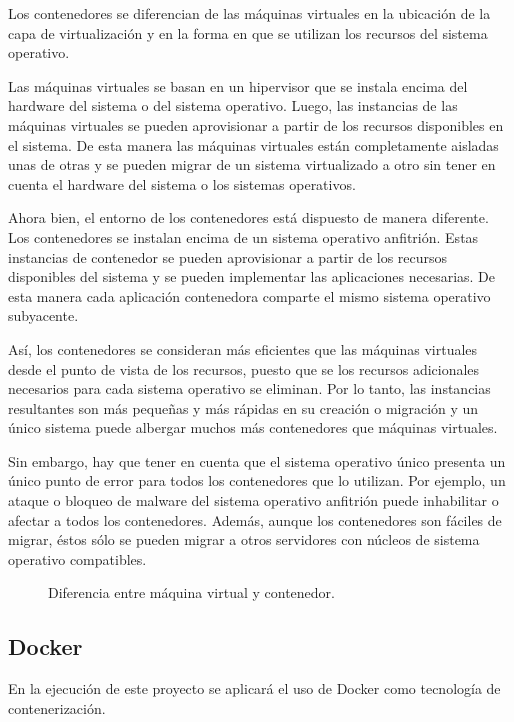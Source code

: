 Los contenedores se diferencian de las máquinas virtuales en la ubicación de la capa de virtualización y en la forma en que se utilizan los recursos del sistema operativo.

Las máquinas virtuales se basan en un hipervisor que se instala encima del hardware del sistema o del sistema operativo. Luego, las instancias de las máquinas virtuales se pueden aprovisionar a partir de los recursos disponibles en el sistema. De esta manera las máquinas virtuales están completamente aisladas unas de otras y se pueden migrar de un sistema virtualizado a otro sin tener en cuenta el hardware del sistema o los sistemas operativos.

Ahora bien, el entorno de los contenedores está dispuesto de manera diferente. Los contenedores se instalan encima de un sistema operativo anfitrión. Estas instancias de contenedor se pueden aprovisionar a partir de los recursos disponibles del sistema y se pueden implementar las aplicaciones necesarias. De esta manera cada aplicación contenedora comparte el mismo sistema operativo subyacente.

Así, los contenedores se consideran más eficientes que las máquinas virtuales desde el punto de vista de los recursos, puesto que se los recursos adicionales necesarios para cada sistema operativo se eliminan. Por lo tanto, las instancias resultantes son más pequeñas y más rápidas en su creación o migración y un único sistema puede albergar muchos más contenedores que máquinas virtuales.

Sin embargo, hay que tener en cuenta que el sistema operativo único presenta un único punto de error para todos los contenedores que lo utilizan. Por ejemplo, un ataque o bloqueo de malware del sistema operativo anfitrión puede inhabilitar o afectar a todos los contenedores. Además, aunque los contenedores son fáciles de migrar, éstos sólo se pueden migrar a otros servidores con núcleos de sistema operativo compatibles.

\begin{figure}[H]
\caption{Diferencia entre máquina virtual y contenedor.\label{fig:figure_placement_example}}
\end{figure}

\subsection{Docker}

En la ejecución de este proyecto se aplicará el uso de Docker como tecnología de contenerización.

